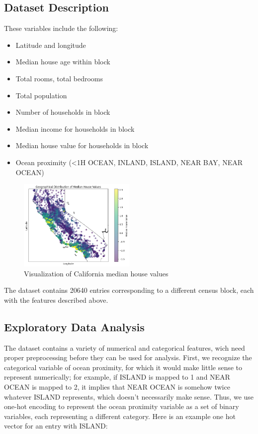 \documentclass[letterpaper,twocolumn,10pt]{article}
\begin{document}
\subsection{Dataset Description}
These variables include the following:
\begin{itemize}
    \item Latitude and longitude
    \item Median house age within block
    \item Total rooms, total bedrooms
    \item Total population
    \item Number of households in block
    \item Median income for households in block
    \item Median house value for households in block
    \item Ocean proximity (<1H OCEAN, INLAND, ISLAND, NEAR BAY, NEAR OCEAN)
\end{itemize}

\begin{figure}%
\centering
\includegraphics[width=0.5\textwidth]{images/california_map.png}
\caption{Visualization of California median house values}
\label{fig:california_map}
\end{figure}

The dataset contains 20640 entries corresponding to a different census block, each with the features described above.

\subsection{Exploratory Data Analysis}

The dataset contains a variety of numerical and categorical features, wich need proper preprocessing before they can be used for analysis.
First, we recognize the categorical variable of ocean proximity, for which it would make little sense to represent numerically; for example, if ISLAND is mapped to 1 and NEAR OCEAN is mapped to 2, it implies that NEAR OCEAN is somehow twice whatever ISLAND represents, which doesn't necessarily make sense.
Thus, we use one-hot encoding to represent the ocean proximity variable as a set of binary variables, each representing a different category.
Here is an example one hot vector for an entry with ISLAND:
\end{document}
